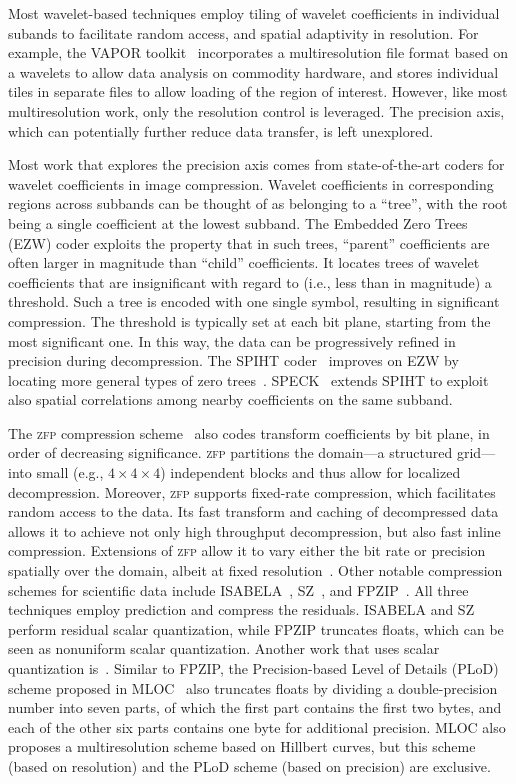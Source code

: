 Most wavelet-based techniques employ tiling of wavelet coefficients in individual subands to
facilitate random access, and spatial adaptivity in resolution. For example, the VAPOR
toolkit~\cite{vapor2007} incorporates a multiresolution file format based on a wavelets to allow
data analysis on commodity hardware, and stores individual tiles in separate files to allow loading
of the region of interest. However, like most multiresolution work, only the resolution control is
leveraged. The precision axis, which can potentially further reduce data transfer, is left
unexplored.

Most work that explores the precision axis comes from state-of-the-art coders for wavelet
coefficients in image compression. Wavelet coefficients in corresponding regions across subbands can
be thought of as belonging to a ``tree'', with the root being a single coefficient at the lowest
subband. The Embedded Zero Trees (EZW) coder exploits the property that in such trees, ``parent''
coefficients are often larger in magnitude than ``child'' coefficients. It locates trees of wavelet
coefficients that are insignificant with regard to (i.e., less than in magnitude) a threshold. Such
a tree is encoded with one single symbol, resulting in significant compression. The threshold is
typically set at each bit plane, starting from the most significant one. In this way, the data can
be progressively refined in precision during decompression. The SPIHT coder~\cite{spiht1996}
improves on EZW by locating more general types of zero trees~\cite{quantifying-coding-performance}.
SPECK~\cite{speck2004} extends SPIHT to exploit also spatial correlations among nearby coefficients
on the same subband.

\newcommand{\zfp}{\textsc{zfp}\xspace}
The \zfp compression scheme~\cite{zfp2014} also codes transform coefficients by bit plane, in order
of decreasing significance. \zfp partitions the domain---a structured grid---into small (e.g., $4
\times 4 \times 4$) independent blocks and thus allow for localized decompression. Moreover, \zfp
supports fixed-rate compression, which facilitates random access to the data. Its fast transform and
caching of decompressed data allows it to achieve not only high throughput decompression, but also
fast inline compression. Extensions of \zfp allow it to vary either the bit rate or precision
spatially over the domain, albeit at fixed resolution~\cite{zfp-arc}. Other notable compression
schemes for scientific data include ISABELA~\cite{isabela}, SZ~\cite{sz}, and FPZIP~\cite{fpzip}.
All three techniques employ prediction and compress the residuals. ISABELA and SZ perform residual
scalar quantization, while FPZIP truncates floats, which can be seen as nonuniform scalar
quantization. Another work that uses scalar quantization is~\cite{sqe}. Similar to FPZIP, the
Precision-based Level of Details (PLoD) scheme proposed in MLOC~\cite{mloc} also truncates floats by
dividing a double-precision number into seven parts, of which the first part contains the first two
bytes, and each of the other six parts contains one byte for additional precision. MLOC also
proposes a multiresolution scheme based on Hillbert curves, but this scheme (based on resolution)
and the PLoD scheme (based on precision) are exclusive.

